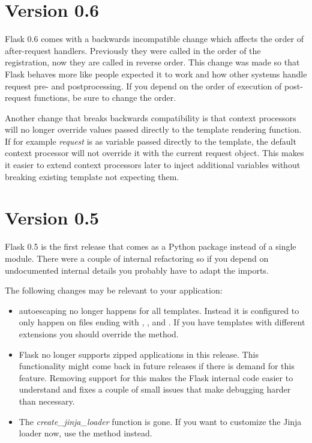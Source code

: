 \documentclass[a4paper,12pt]{sphinxmanual}
\begin{document}
\section{Version 0.6}
\label{upgrading:version-0-6}
Flask 0.6 comes with a backwards incompatible change which affects the
order of after-request handlers.  Previously they were called in the order
of the registration, now they are called in reverse order.  This change
was made so that Flask behaves more like people expected it to work and
how other systems handle request pre- and postprocessing.  If you
depend on the order of execution of post-request functions, be sure to
change the order.

Another change that breaks backwards compatibility is that context
processors will no longer override values passed directly to the template
rendering function.  If for example \emph{request} is as variable passed
directly to the template, the default context processor will not override
it with the current request object.  This makes it easier to extend
context processors later to inject additional variables without breaking
existing template not expecting them.


\section{Version 0.5}
\label{upgrading:version-0-5}
Flask 0.5 is the first release that comes as a Python package instead of a
single module.  There were a couple of internal refactoring so if you
depend on undocumented internal details you probably have to adapt the
imports.

The following changes may be relevant to your application:
\begin{itemize}
\item {} 
autoescaping no longer happens for all templates.  Instead it is
configured to only happen on files ending with , ,
 and .  If you have templates with different
extensions you should override the
{\hyperref[api:flask.Flask.select_jinja_autoescape]{}} method.

\item {} 
Flask no longer supports zipped applications in this release.  This
functionality might come back in future releases if there is demand
for this feature.  Removing support for this makes the Flask internal
code easier to understand and fixes a couple of small issues that make
debugging harder than necessary.

\item {} 
The \emph{create\_jinja\_loader} function is gone.  If you want to customize
the Jinja loader now, use the
{\hyperref[api:flask.Flask.create_jinja_environment]{}} method instead.

\end{itemize}
\end{document}
